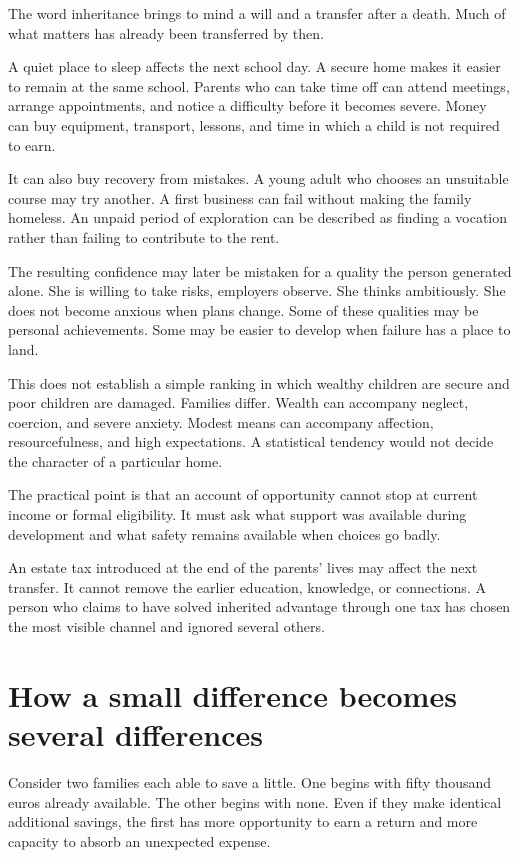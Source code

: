 \documentclass[12pt,a4paper]{book}
\begin{document}
The word inheritance brings to mind a will and a transfer after a death. Much of what matters has already been transferred by then.

A quiet place to sleep affects the next school day. A secure home makes it easier to remain at the same school. Parents who can take time off can attend meetings, arrange appointments, and notice a difficulty before it becomes severe. Money can buy equipment, transport, lessons, and time in which a child is not required to earn.

It can also buy recovery from mistakes. A young adult who chooses an unsuitable course may try another. A first business can fail without making the family homeless. An unpaid period of exploration can be described as finding a vocation rather than failing to contribute to the rent.

The resulting confidence may later be mistaken for a quality the person generated alone. She is willing to take risks, employers observe. She thinks ambitiously. She does not become anxious when plans change. Some of these qualities may be personal achievements. Some may be easier to develop when failure has a place to land.

This does not establish a simple ranking in which wealthy children are secure and poor children are damaged. Families differ. Wealth can accompany neglect, coercion, and severe anxiety. Modest means can accompany affection, resourcefulness, and high expectations. A statistical tendency would not decide the character of a particular home.

The practical point is that an account of opportunity cannot stop at current income or formal eligibility. It must ask what support was available during development and what safety remains available when choices go badly.

An estate tax introduced at the end of the parents' lives may affect the next transfer. It cannot remove the earlier education, knowledge, or connections. A person who claims to have solved inherited advantage through one tax has chosen the most visible channel and ignored several others.

\section*{How a small difference becomes several differences}

Consider two families each able to save a little. One begins with fifty thousand euros already available. The other begins with none. Even if they make identical additional savings, the first has more opportunity to earn a return and more capacity to absorb an unexpected expense.
\end{document}
